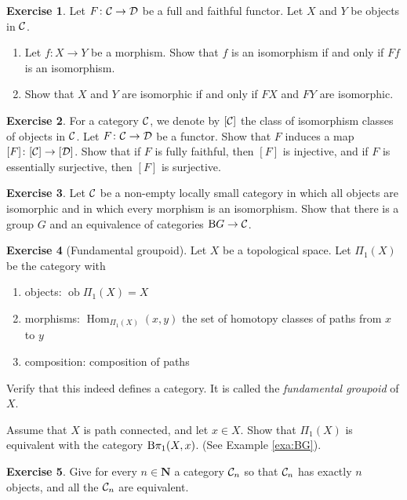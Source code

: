 \documentclass[11pt]{amsbook}
\DeclareMathOperator\Hom{Hom}
\DeclareMathOperator\ob{ob}
\def\bN{{\mathbf{N}}}
\theoremstyle{plain}
\theoremstyle{definition}
\newtheorem{exercise}{Exercise}
\begin{document}
\begin{exercise}\label{exc:fully-faithful-isomorphism}
Let $F\colon {\mathcal{C}} \to {\mathcal{D}}$ be a full and faithful functor. Let $X$ and $Y$ be objects in ${\mathcal{C}}$. 
\begin{enumerate}
\item Let $f \colon X\to Y$ be a morphism. Show that $f$ is an isomorphism if and only if $Ff$ is an isomorphism.
\item Show that $X$ and $Y$ are isomorphic if and only if $FX$ and $FY$ are isomorphic.
\end{enumerate}
\end{exercise}

\begin{exercise}
For a category ${\mathcal{C}}$, we denote by $[{\mathcal{C}}]$ the class of isomorphism classes of objects in ${\mathcal{C}}$. 
Let $F\colon {\mathcal{C}} \to {\mathcal{D}}$ be a functor. Show that $F$ induces a map $[F]\colon [{\mathcal{C}}] \to [{\mathcal{D}}]$. Show that if $F$ is fully faithful, then $[F]$ is injective, and if $F$ is essentially surjective, then $[F]$ is surjective.
\end{exercise}

\begin{exercise}
Let ${\mathcal{C}}$ be a non-empty locally small category in which all objects are isomorphic and in which every morphism is an isomorphism. Show that there is a group $G$ and an equivalence of categories ${\mathrm B} G \to {\mathcal{C}}$.
\end{exercise}


\begin{exercise}[Fundamental groupoid]
Let $X$ be a topological space. Let $\Pi_1(X)$  be the category with
\begin{enumerate}
\item objects: $\ob \Pi_1(X) = X$ 
\item morphisms: $\Hom_{\Pi_1(X)}(x,y)$ the set of homotopy classes of paths from $x$ to $y$
\item composition: composition of paths
\end{enumerate}
Verify that this indeed defines a category. It is called the \emph{fundamental groupoid} of $X$.

Assume that $X$ is path connected, and let $x\in X$. Show that $\Pi_1(X)$ is equivalent with the category ${\mathrm B} \pi_1(X,x)$. (See Example \ref{exa:BG}).
\end{exercise}



\begin{exercise}
Give for every $n\in \bN$ a category ${\mathcal{C}}_n$ so that ${\mathcal{C}}_n$ has exactly $n$ objects, and all the ${\mathcal{C}}_n$ are equivalent.
\end{exercise}
\end{document}

